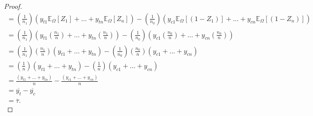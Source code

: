 \documentclass[12pt,leqno]{article}
\theoremstyle{newstyle}
\begin{document}
\begin{proof}
\begin{align*}
= \left(\frac{1}{n_1} \right) \left(y_{t1}\mathbb{E}_{\Omega} \left[ Z_1 \right] + \dots + y_{tn}\mathbb{E}_{\Omega} \left[Z_n\right]\right) - \left(\frac{1}{n_0}\right) \left(y_{c1}\mathbb{E}_{\Omega}\left[\left(1 - Z_1\right) \right] + \dots + y_{cn}\mathbb{E}_{\Omega} \left[\left(1 - Z_n\right) \right]\right) \\ 
= \left(\frac{1}{n_1} \right) \left(y_{t1}\left(\frac{n_1}{n}\right) + \dots + y_{tn}\left(\frac{n_1}{n}\right)\right) - \left(\frac{1}{n_0}\right) \left(y_{c1}\left(\frac{n_0}{n}\right) + \dots + y_{cn}\left(\frac{n_0}{n}\right)\right) \\ 
= \left(\frac{1}{n_1} \right) \left(\frac{n_1}{n}\right) \left(y_{t1} + \dots + y_{tn} \right) - \left(\frac{1}{n_0}\right) \left(\frac{n_0}{n}\right) \left(y_{c1} + \dots + y_{cn} \right) \\
= \left(\frac{1}{n} \right) \left(y_{t1} + \dots + y_{tn} \right) - \left(\frac{1}{n}\right) \left(y_{c1} + \dots + y_{cn} \right) \\
= \frac{\left(y_{t1} + \dots + y_{tn} \right)}{n} - \frac{\left(y_{c1} + \dots + y_{cn} \right)}{n} \\
= \overline{y_{t}} - \overline{y_{c}} \\
= \overline{\tau}.
\end{align*}
\end{proof}



\begin{singlespace}

\end{singlespace}
\end{document}
